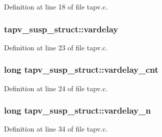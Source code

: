 Definition at line 18 of file tapv.\+c.

\subsubsection[{\texorpdfstring{vardelay}{vardelay}}]{ tapv\+\_\+susp\+\_\+struct\+::vardelay}\hypertarget{structtapv__susp__struct_a31e78badbf0bdbefc5dbe6e1f5120252}{}\label{structtapv__susp__struct_a31e78badbf0bdbefc5dbe6e1f5120252}


Definition at line 23 of file tapv.\+c.

\subsubsection[{\texorpdfstring{vardelay\+\_\+cnt}{vardelay_cnt}}]{\setlength{\rightskip}{0pt plus 5cm}long tapv\+\_\+susp\+\_\+struct\+::vardelay\+\_\+cnt}\hypertarget{structtapv__susp__struct_aefe2c6e63778228470af61a38a5cf644}{}\label{structtapv__susp__struct_aefe2c6e63778228470af61a38a5cf644}


Definition at line 24 of file tapv.\+c.

\subsubsection[{\texorpdfstring{vardelay\+\_\+n}{vardelay_n}}]{\setlength{\rightskip}{0pt plus 5cm}long tapv\+\_\+susp\+\_\+struct\+::vardelay\+\_\+n}\hypertarget{structtapv__susp__struct_a3291327bfae272460373fad0dcc90f2e}{}\label{structtapv__susp__struct_a3291327bfae272460373fad0dcc90f2e}


Definition at line 34 of file tapv.\+c.

